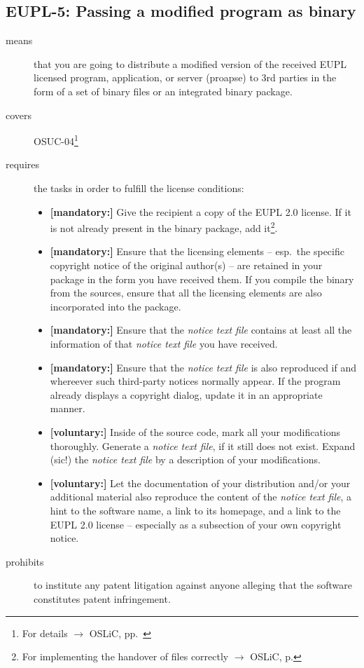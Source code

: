 \subsection{EUPL-5: Passing a modified program as binary}

\begin{description}
\item[means] that you are going to distribute a modified version of the received
EUPL licensed pro\-gram, application, or server (proapse) to 3rd parties in
the form of a set of binary files or an integrated binary package.
\item[covers] OSUC-04\footnote{For details $\rightarrow$ OSLiC, pp.\ \pageref{OSUC-04-DEF}}
\item[requires] the tasks in order to fulfill the license conditions:
\begin{itemize}

 \item \textbf{[mandatory:]} Give the recipient a copy of the EUPL 2.0
  license. If it is not already present in the binary package, add
  it\footnote{For implementing the handover of files correctly $\rightarrow$
  OSLiC, p. \pageref{DistributingFilesHint}}.
  
  \item \textbf{[mandatory:]} Ensure that the licensing elements -- esp.\ the
  specific copyright notice of the original author(s) -- are retained in your
  package in the form you have received them. If you compile the binary from the
  sources, ensure that all the licensing elements are also incorporated into the
  package.
  
  \item \textbf{[mandatory:]} Ensure that the \emph{notice text file} contains at least
  all the information of that \emph{notice text file} you have received.
  
  \item \textbf{[mandatory:]} Ensure that the \emph{notice text file} is also
  reproduced if and whereever such third-party notices normally appear. If the
  program already displays a copyright dialog, update it in an appropriate
  manner.
 
  \item \textbf{[voluntary:]} Inside of the source code, mark all your
  modifications thoroughly. Generate a \emph{notice text file}, if it still does not
  exist. Expand (sic!) the \emph{notice text file} by a description of your
  modifications.
 
  \item \textbf{[voluntary:]} Let the documentation of your distribution and/or
  your additional material also reproduce the content of the \emph{notice text
  file}, a hint to the software name, a link to its homepage, and a link to the
  EUPL 2.0 license -- especially as a subsection of your own copyright notice.

\end{itemize}

\item[prohibits] to institute any patent litigation against anyone alleging that
the software constitutes patent infringement.

\end{description}


